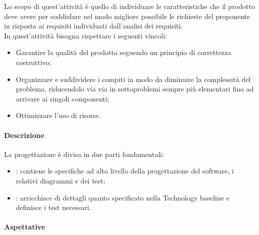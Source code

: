 Lo scopo di quest'attività è quello di individuare le caratteristiche che il prodotto deve avere per soddisfare nel 
modo migliore possibile le richieste del proponente in risposta ai requisiti individuati dall'analisi dei requisiti. \\
In quest'attività bisogna rispettare i seguenti vincoli:
\begin{itemize}
    \item Garantire la qualità del prodotto seguendo un principio di correttezza costruttivo;
    \item Organizzare e suddividere i compiti in modo da diminuire la complessità del problema, riducendolo via via in 
    sottoproblemi sempre più elementari fino ad arrivare ai singoli componenti;
    \item Ottimizzare l'uso di risorse.
\end{itemize}

\paragraph{Descrizione}
La progettazione è divisa in due parti fondamentali:
\begin{itemize}
    \item {}: contiene le specifiche ad alto livello della progettazione del software, 
    i relativi diagrammi  e dei test;
    \item {}: arricchisce di dettagli quanto specificato nella Technology baseline e 
    definisce i test necessari.
\end{itemize}

\paragraph{Aspettative}

